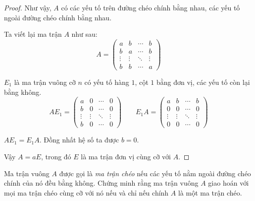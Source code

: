 \documentclass[class=nhvh-linear-algebra,crop=false]{standalone}
\begin{document}
\begin{proof}
    \par Như vậy, $A$ có các yếu tố trên đường chéo chính bằng nhau, các yếu tố ngoài đường chéo chính bằng nhau.
    \par Ta viết lại ma trận $A$ như sau:
    \[
        A =
        \begin{pmatrix}
            a      & b      & \cdots & b      \\
            b      & a      & \cdots & b      \\
            \vdots & \vdots & \ddots & \vdots \\
            b      & b      & \cdots & a
        \end{pmatrix}
    \]
    \par $E_{1}$ là ma trận vuông cỡ $n$ có yếu tố hàng $1$, cột $1$ bằng đơn vị, các yếu tố còn lại bằng không.
    \[
        AE_{1} =
        \begin{pmatrix}
            a      & 0      & \cdots & 0      \\
            b      & 0      & \cdots & 0      \\
            \vdots & \vdots & \ddots & \vdots \\
            b      & 0      & \cdots & 0
        \end{pmatrix}
        \qquad
        E_{1}A =
        \begin{pmatrix}
            a      & b      & \cdots & b      \\
            0      & 0      & \cdots & 0      \\
            \vdots & \vdots & \ddots & \vdots \\
            0      & 0      & \cdots & 0
        \end{pmatrix}
    \]
    \par $AE_{1} = E_{1}A$. Đồng nhất hệ số ta được $b = 0$.
    \par Vậy $A = aE$, trong đó $E$ là ma trận đơn vị cùng cỡ với $A$.
\end{proof}

\begin{exercise}
    Ma trận vuông $A$ được gọi là \textit{ma trận chéo} nếu các yếu tố nằm ngoài đường chéo chính của nó đều bằng không. Chứng minh rằng ma trận vuông $A$ giao hoán với mọi ma trận chéo cùng cỡ với nó nếu và chỉ nếu chính $A$ là một ma trận chéo.
\end{exercise}
\end{document}
